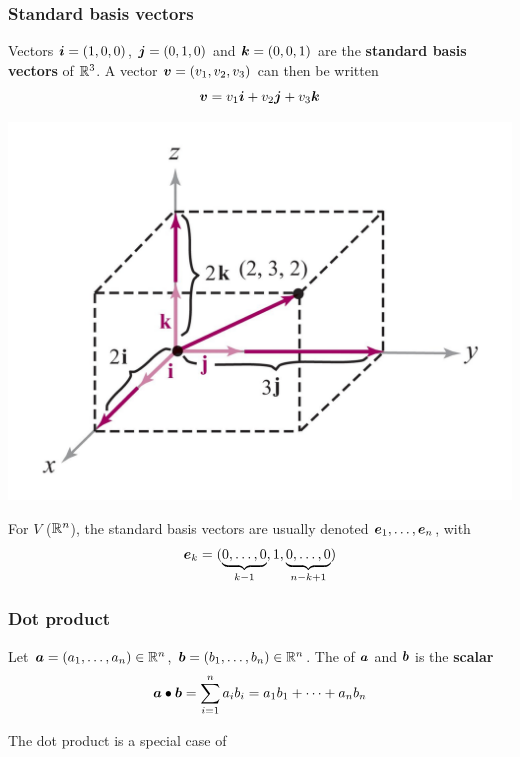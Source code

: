 \documentclass[aspectratio=169]{beamer}\usepackage[]{graphicx}\usepackage[]{xcolor}
\begin{document}
\begin{frame}
\frametitle{Standard basis vectors}
	\begin{minipage}{0.49\textwidth}
		Vectors ${\bm{i}}=(1,0,0)$, ${\bm{j}}=(0,1,0)$ and ${\bm{k}}=(0,0,1)$ are the \textbf{standard basis vectors} of $\mathbb{R}^3$. A vector $\bm{v}=(v_1,v_2,v_3)$ can then be written
		\[
		\bm{v}=v_1{\bm{i}}+v_2{\bm{j}}+v_3{\bm{k}}
		\]
	\end{minipage}
	\begin{minipage}{0.49\textwidth}
		\begin{center}
			\includegraphics[width=1.15\textwidth]{FIGS/vect_comb_lin_standard_basis_vectors}
		\end{center}
	\end{minipage}
	\vfill
	For $V$ ($\mathbb{R}^n$), the standard basis vectors are usually denoted $\bm{e}_1,\ldots,\bm{e}_n$, with 
	\[
	\bm{e}_k=(\underbrace{0,\ldots,0}_{k-1},1,\underbrace{0,\ldots,0}_{n-k+1})
	\]
\end{frame}

\begin{frame}
\frametitle{Dot product}
	\begin{definition}
		Let $\bm{a}=(a_1,\ldots,a_n)\in \mathbb{R}^n$, $\bm{b}=(b_1,\ldots,b_n)\in\mathbb{R}^n$. 
		The  of $\bm{a}$ and $\bm{b}$ is the \textbf{scalar}
		\[
		\bm{a}\bullet \bm{b}=\sum_{i=1}^n a_ib_i=a_1b_1+\cdots+a_nb_n
		\]
	\end{definition}
\vfill
The dot product is a special case of 
\end{frame}
\end{document}
